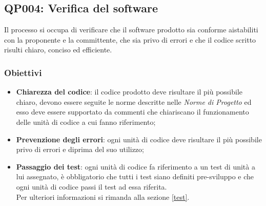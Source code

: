 \subsection{QP004: Verifica del software}\label{pro4}
Il processo si occupa di verificare che il software prodotto sia conforme aistabiliti con la proponente e la committente, che sia privo di errori e che il codice scritto risulti chiaro, conciso ed efficiente.
\subsubsection{Obiettivi}
\begin{itemize}
	\item \textbf{Chiarezza del codice}: il codice prodotto deve risultare il più possibile chiaro, devono essere seguite le norme descritte nelle \textit{Norme di Progetto} ed esso deve essere supportato da commenti che chiariscano il funzionamento delle unità di codice a cui fanno riferimento;
	\item \textbf{Prevenzione degli errori}: ogni unità di codice deve risultare il più possibile privo di errori e diprima del suo utilizzo;
	\item \textbf{Passaggio dei test}: ogni unità di codice fa riferimento a un test di unità a lui assegnato, è obbligatorio che tutti i test siano definiti pre-sviluppo e che ogni unità di codice passi il test ad essa riferita.\\
	Per ulteriori informazioni si rimanda alla sezione \ref{test}.
\end{itemize}
